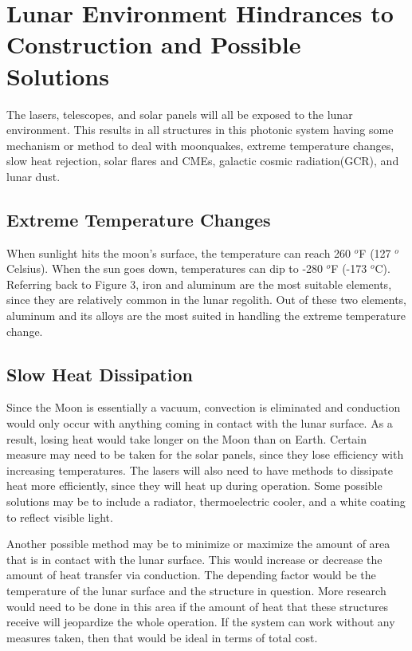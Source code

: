\documentclass{aa}
\begin{document}
\section{Lunar Environment Hindrances to Construction and Possible Solutions}
The lasers, telescopes, and solar panels will all be exposed to the lunar environment. This results in all structures in this photonic system having some mechanism or method to deal with moonquakes, extreme temperature changes, slow heat rejection, solar flares and CMEs, galactic cosmic radiation(GCR), and lunar dust.

\subsection {Extreme Temperature Changes}
When sunlight hits the moon's surface, the temperature can reach 260 $^o$F (127 $^o$Celsius). When the sun goes down, temperatures can dip to -280 $^o$F (-173 $^o$C). Referring back to Figure 3, iron and aluminum are the most suitable elements, since they are relatively common in the lunar regolith. Out of these two elements, aluminum and its alloys are the most suited in handling the extreme temperature change. 

\subsection{Slow Heat Dissipation}
Since the Moon is essentially a vacuum, convection is eliminated and conduction would only occur with anything coming in contact with the lunar surface. As a result, losing heat would take longer on the Moon than on Earth. Certain measure may need to be taken for the solar panels, since they lose efficiency with increasing temperatures. The lasers will also need to have methods to dissipate heat more efficiently, since they will heat up during operation. Some possible solutions may be to include a radiator, thermoelectric cooler, and a white coating to reflect visible light.

Another possible method may be to minimize or maximize the amount of area that is in contact with the lunar surface. This would increase or decrease the amount of heat transfer via conduction. The depending factor would be the temperature of the lunar surface and the structure in question. More research would need to be done in this area if the amount of heat that these structures receive will jeopardize the whole operation. If the system can work without any measures taken, then that would be ideal in terms of total cost.
\end{document}
